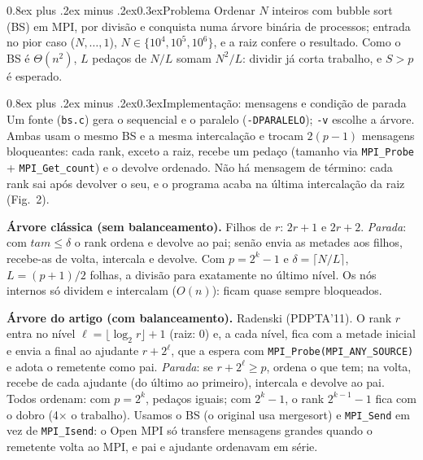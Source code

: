 \documentclass[10pt,a4paper,twocolumn]{article}
\makeatletter
\renewcommand\section{\@startsection{section}{1}{0pt}%
  {0.8ex plus .2ex minus .2ex}{0.3ex}{\normalsize\bfseries}}
\makeatother
\begin{document}

\section{Problema}
Ordenar $N$ inteiros com bubble sort (BS) em MPI, por divisão e conquista
numa árvore binária de processos; entrada no pior caso ($N, \dots, 1$),
$N \in \{10^4, 10^5, 10^6\}$, e a raiz confere o resultado. Como o BS é
$\Theta(n^2)$, $L$ pedaços de $N/L$ somam $N^2/L$: dividir já corta
trabalho, e $S > p$ é esperado.

\section{Implementação: mensagens e condição de parada}
Um fonte (\texttt{bs.c}) gera o sequencial e o paralelo
(\texttt{-DPARALELO}); \texttt{-v} escolhe a árvore. Ambas usam o mesmo BS e
a mesma intercalação e trocam $2(p{-}1)$ mensagens bloqueantes: cada rank,
exceto a raiz, recebe um pedaço (tamanho via \texttt{MPI\_Probe} +
\texttt{MPI\_Get\_count}) e o devolve ordenado. Não há mensagem de término:
cada rank sai após devolver o seu, e o programa acaba na última intercalação
da raiz (Fig.~2).

\textbf{Árvore clássica (sem balanceamento).} Filhos de $r$: $2r{+}1$ e
$2r{+}2$. \emph{Parada}: com $\mathit{tam} \le \delta$ o rank ordena e
devolve ao pai; senão envia as metades aos filhos, recebe-as de volta,
intercala e devolve. Com $p = 2^k{-}1$ e $\delta = \lceil N/L \rceil$,
$L = (p{+}1)/2$ folhas, a divisão para exatamente no último nível. Os nós
internos só dividem e intercalam ($O(n)$): ficam quase sempre bloqueados.

\textbf{Árvore do artigo (com balanceamento).} Radenski (PDPTA'11). O rank
$r$ entra no nível $\ell = \lfloor \log_2 r \rfloor + 1$ (raiz: 0) e, a cada
nível, fica com a metade inicial e envia a final ao ajudante $r + 2^{\ell}$,
que a espera com \texttt{MPI\_Probe(MPI\_ANY\_SOURCE)} e adota o remetente
como pai. \emph{Parada}: se $r + 2^{\ell} \ge p$, ordena o que tem; na volta,
recebe de cada ajudante (do último ao primeiro), intercala e devolve ao pai.
Todos ordenam: com $p = 2^k$, pedaços iguais; com $2^k{-}1$, o rank
$2^{k-1}{-}1$ fica com o dobro (4$\times$ o trabalho). Usamos o BS (o
original usa mergesort) e \texttt{MPI\_Send} em vez de \texttt{MPI\_Isend}: o
Open MPI só transfere mensagens grandes quando o remetente volta ao MPI, e pai
e ajudante ordenavam em série.
\end{document}
